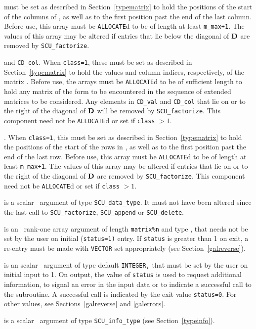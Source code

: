 \documentclass{galahad}
\newcommand{\packagename}{SCU}
\begin{document}
\begin{description}
\begin{description}
 must be set as described in Section~\ref{typematrix}
to hold the 
positions of the start of the columns of , as well as to the first 
position past the end of the last column. 
Before use, this array must be {\tt ALLOCATE}d to be of length at least 
{\tt m\_max+1}. 
The values of this array may be altered if entries that lie 
below the diagonal of ${\mathbf{D}}$ are removed by {\tt \packagename\_factorize}. 
 
 and {\tt CD\_col}.   
When {\tt class=1}, 
these must be set as described in Section~\ref{typematrix} to hold the 
values and column indices, respectively, of the matrix .  
Before use, the arrays must be {\tt ALLOCATE}d 
to be of sufficient length to hold any matrix of the form  
to be encountered in the sequence of 
extended matrices to be considered. Any elements in 
{\tt CD\_val} and {\tt CD\_col} 
that lie on or to the right of the diagonal of ${\mathbf{D}}$ will be removed by  
{\tt \packagename\_factorize}. 
This component need not be {\tt ALLOCATE}d or set if {\tt class} $> 1$. 
 
. When {\tt class=1}, 
this must be set as described in Section~\ref{typematrix} to hold the 
positions of the start of the rows in , as well as to the first 
position past the end of the last row. 
Before use, this array must be {\tt ALLOCATE}d to be of length at least 
{\tt m\_max+1}. 
The values of this array may be altered if entries that lie on or to the 
right of the diagonal of ${\mathbf{D}}$ are removed by {\tt \packagename\_factorize}. 
This component need not be {\tt ALLOCATE}d or set if {\tt class} $> 1$. 
 
\end{description} 
 
 is a scalar \intentinout\ argument of type 
{\tt \packagename\_data\_type}. 
It must not have been altered since the last call to  
{\tt \packagename\_factorize}, 
{\tt \packagename\_append} or 
{\tt \packagename\_delete}. 
 
 is an \intentinout\ rank-one array argument of length 
{\tt matrix\%n} 
and type \realdp, 
that needs not be set by 
the user on initial ({\tt status=1)} entry. If {\tt status} is greater than 
1 on exit, a re-entry must be made with {\tt VECTOR} set appropriately 
(see Section~\ref{galreverse}). 
 
 is an scalar \intentinout\ argument of type 
default {\tt INTEGER,} that  
must be set by the user on initial input to 1. On output, the value of 
{\tt status} 
is used to request additional information, to signal an error 
in the input data or to indicate a successful call to the subroutine. 
A successful call is indicated by the exit value {\tt status=0}. 
For other values, see Sections~\ref{galreverse} and \ref{galerrors}. 
 
 is a scalar \intentinout\ argument of type 
{\tt \packagename\_info\_type} 
(see Section~\ref{typeinfo}). 
 
\end{description}
\end{document}
